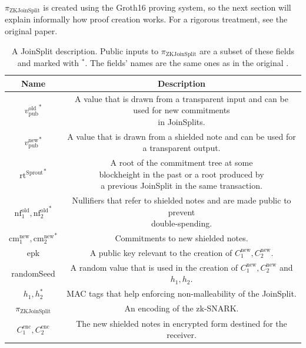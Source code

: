 \documentclass{article}
\begin{document}
$\pi_\text{ZKJoinSplit}$ is created using the Groth16 \cite{groth:zksnark} proving system, so the next section will explain informally how proof creation works.
For a rigorous treatment, see the original paper.

\begin{center}
\begin{table}
{\tiny
\begin{tabular}{ |c|c| } 
        \hline
        \textbf{Name} & \textbf{Description} \\
        \hline
        \rule{0pt}{4ex} {\small ${v_\text{pub}^\text{old}}^\ast$} & \makecell{A value that is drawn from a transparent input and can be used for new commitments\\ in JoinSplits.} \\
        \hline
        \rule{0pt}{4ex} {\small ${v_\text{pub}^\text{new}}^\ast$} & \makecell{A value that is drawn from a shielded note and can be used for\\ a transparent output.} \\
        \hline
        \rule{0pt}{4ex} {\small ${\text{rt}^\text{Sprout}}^\ast$} & \makecell{A root of the commitment tree at some \\ blockheight in the past or a root produced by\\ a previous JoinSplit in the same transaction.} \\
        \hline
        \rule{0pt}{4ex} {\small $\text{nf}_1^\text{old}, {\text{nf}_2^\text{old}}^\ast$} & \makecell{Nullifiers that refer to shielded notes and are made public to prevent\\ double-spending.} \\
        \hline
        \rule{0pt}{4ex} {\small $\text{cm}_1^\text{new}, {\text{cm}_2^\text{new}}^\ast$} & Commitments to new shielded notes. \\
        \hline
        \rule{0pt}{4ex} {\small epk} & A public key relevant to the creation of $C_1^\text{new}, C_2^\text{new}$. \\
        \hline
        \rule{0pt}{4ex} {\small randomSeed} & \makecell{A random value that is used in the creation of $C_1^\text{new}, C_2^\text{new}$ and\\ $h_1, h_2$.} \\
        \hline
        \rule{0pt}{4ex} {\small $h_1, h_2^\ast$} & MAC tags that help enforcing non-malleability of the JoinSplit. \\
        \hline
        \rule{0pt}{4ex} {\small $\pi_\text{ZKJoinSplit}$} & An encoding of the zk-SNARK. \\
        \hline
        \rule{0pt}{4ex} {\small $C_1^\text{enc}, C_2^\text{enc}$} & The new shielded notes in encrypted form destined for the receiver. \\
        \hline
\end{tabular}}
\caption{A JoinSplit description. Public inputs to $\pi_\text{ZKJoinSplit}$ are a subset of these fields and marked with $^\ast$. The fields' names are the same ones as in the original \protect\cite{hopwood:zcash}.} \label{fig:joinsplit}
\end{table}
\end{center}
\end{document}
